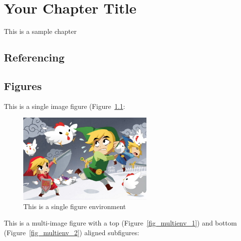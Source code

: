 \chapter{Your Chapter Title}

This is a sample chapter

\section{Referencing}

\section{Figures}
This is a single image figure (Figure~\ref{fig_singleenv}:

\begin{figure}[ht]
	\centering
	\includegraphics[width=0.6\textwidth]{figures/Sample/tumblr_static_eaceks0rfxsss8o4swscw40wo.jpg}
	\caption[Single Figure Environment Listed Title]{This is a single figure environment}
	\label{fig_singleenv}
\end{figure}

This is a multi-image figure with a top (Figure~\ref{fig_multienv_1}) and bottom (Figure~\ref{fig_multienv_2}) aligned subfigures:

